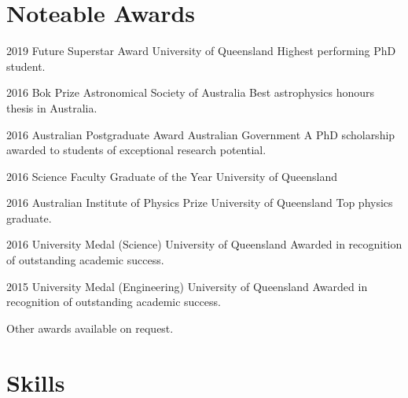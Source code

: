 \documentclass[11pt]{friggeri-cv}
\begin{document}
\section{Noteable Awards}
\begin{entrylist}
	\wentryInline
	{2019} %
	{Future Superstar Award}
	{University of Queensland}
	{Highest performing PhD student.}
\end{entrylist}
\begin{entrylist}
	\wentryInline
	{2016} %
	{Bok Prize}
	{Astronomical Society of Australia}
	{Best astrophysics honours thesis in Australia.}
\end{entrylist}
\begin{entrylist}
	\wentryInlineSmall
	{2016} %
	{Australian Postgraduate Award}
	{Australian Government}
	{A PhD scholarship awarded to students of exceptional research potential.}
\end{entrylist}
\begin{entrylist}
	\wentryInlineSmall
	{2016} %
	{Science Faculty Graduate of the Year}
	{University of Queensland}
	{}
\end{entrylist}
\begin{entrylist}
	\wentryInline
	{2016} %
	{Australian Institute of Physics Prize}
	{University of Queensland}
	{Top physics graduate.}
\end{entrylist}
\begin{entrylist}
	\wentryInlineSmall
	{2016} %
	{University Medal (Science)}
	{University of Queensland}
	{Awarded in recognition of outstanding academic success.}
\end{entrylist}
\begin{entrylist}
	\wentryInlineSmall
	{2015} %
	{University Medal (Engineering)}
	{University of Queensland}
	{Awarded in recognition of outstanding academic success.}
\end{entrylist}
\vspace{-5mm}

Other awards available on request.

\section{Skills}
\end{document}

